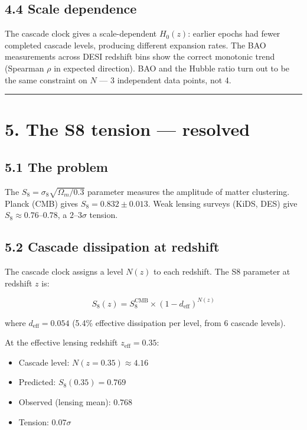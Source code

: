 \documentclass[11pt,a4paper]{article}
\providecommand{\tightlist}{\setlength{\itemsep}{0pt}\setlength{\parskip}{0pt}}
\begin{document}
\subsection*{4.4 Scale dependence}

The cascade clock gives a scale-dependent $H_0(z)$: earlier epochs had fewer completed cascade levels, producing different expansion rates. The BAO measurements across DESI redshift bins show the correct monotonic trend (Spearman $\rho$ in expected direction). BAO and the Hubble ratio turn out to be the same constraint on $N$ — 3 independent data points, not 4.

\begin{center}\rule{0.5\linewidth}{0.4pt}\end{center}

\section*{5. The S8 tension — resolved}

\subsection*{5.1 The problem}

The $S_8 = \sigma_8 \sqrt{\Omega_m/0.3}$ parameter measures the amplitude of matter clustering. Planck (CMB) gives $S_8 = 0.832 \pm 0.013$. Weak lensing surveys (KiDS, DES) give $S_8 \approx 0.76$–$0.78$, a $2$–$3\sigma$ tension.

\subsection*{5.2 Cascade dissipation at redshift}

The cascade clock assigns a level $N(z)$ to each redshift. The S8 parameter at redshift $z$ is:

\[S_8(z) = S_8^{\text{CMB}} \times \left(1 - d_{\text{eff}}\right)^{N(z)}\]

where $d_{\text{eff}} = 0.054$ (5.4\% effective dissipation per level, from 6 cascade levels).

At the effective lensing redshift $z_{\text{eff}} = 0.35$:
\begin{itemize}\tightlist
\item Cascade level: $N(z = 0.35) \approx 4.16$
\item Predicted: $S_8(0.35) = 0.769$
\item Observed (lensing mean): $0.768$
\item Tension: $0.07\sigma$
\end{itemize}
\end{document}

